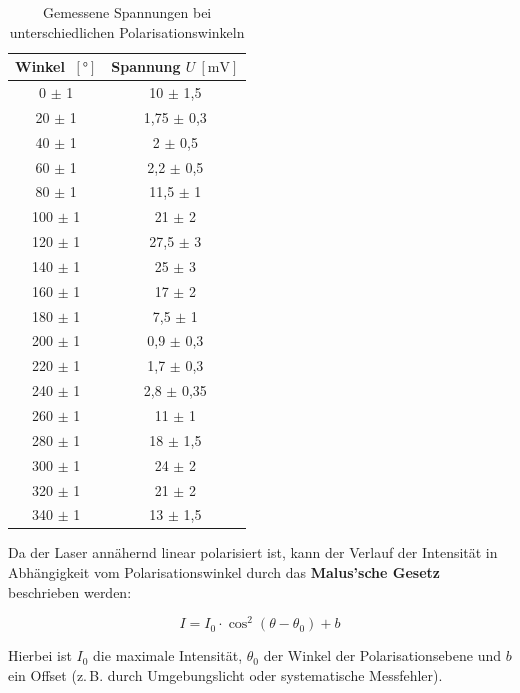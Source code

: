 \begin{table}[htbp]
    \centering
    \begin{tabular}{c|c}
        Winkel \(~[\text{°}]\) & Spannung \(U~[\text{mV}]\) \\
        \hline
        0 \(\pm\) 1 & 10 \(\pm\) 1{,}5 \\
        20 \(\pm\) 1 & 1{,}75 \(\pm\) 0{,}3 \\
        40 \(\pm\) 1 & 2 \(\pm\) 0{,}5 \\
        60 \(\pm\) 1 & 2{,}2 \(\pm\) 0{,}5 \\
        80 \(\pm\) 1 & 11{,}5 \(\pm\) 1 \\
        100 \(\pm\) 1 & 21 \(\pm\) 2 \\
        120 \(\pm\) 1 & 27{,}5 \(\pm\) 3 \\
        140 \(\pm\) 1 & 25 \(\pm\) 3 \\
        160 \(\pm\) 1 & 17 \(\pm\) 2 \\
        180 \(\pm\) 1 & 7{,}5 \(\pm\) 1 \\
        200 \(\pm\) 1 & 0{,}9 \(\pm\) 0{,}3 \\
        220 \(\pm\) 1 & 1{,}7 \(\pm\) 0{,}3 \\
        240 \(\pm\) 1 & 2{,}8 \(\pm\) 0{,}35 \\
        260 \(\pm\) 1 & 11 \(\pm\) 1 \\
        280 \(\pm\) 1 & 18 \(\pm\) 1{,}5 \\
        300 \(\pm\) 1 & 24 \(\pm\) 2 \\
        320 \(\pm\) 1 & 21 \(\pm\) 2 \\
        340 \(\pm\) 1 & 13 \(\pm\) 1{,}5 \\
    \end{tabular}
    \caption{Gemessene Spannungen bei unterschiedlichen Polarisationswinkeln}
    \label{tab:Wellenlaenge}
\end{table}

Da der Laser annähernd linear polarisiert ist, kann der Verlauf der Intensität in Abhängigkeit vom Polarisationswinkel durch das \textbf{Malus’sche Gesetz} beschrieben werden:

\begin{equation*}
    I = I_0 \cdot \cos^2(\theta - \theta_0) + b
\end{equation*}

Hierbei ist $I_0$ die maximale Intensität, $\theta_0$ der Winkel der Polarisationsebene und $b$ ein Offset (z.\,B. durch Umgebungslicht oder systematische Messfehler).


